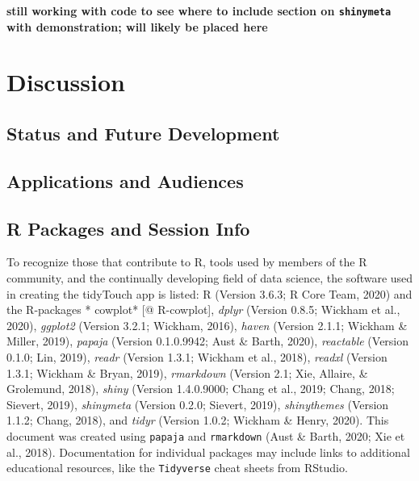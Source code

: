 \documentclass[english,man,floatsintext]{apa6}
\begin{document}
\textbf{still working with code to see where to include section on \texttt{shinymeta} with demonstration; will likely be placed here}

\hypertarget{discussion}{%
\section{Discussion}\label{discussion}}

\hypertarget{status-and-future-development}{%
\subsection{Status and Future Development}\label{status-and-future-development}}

\hypertarget{applications-and-audiences}{%
\subsection{Applications and Audiences}\label{applications-and-audiences}}

\hypertarget{r-packages-and-session-info}{%
\subsection{R Packages and Session Info}\label{r-packages-and-session-info}}

To recognize those that contribute to R, tools used by members of the R community, and the continually developing field of data science, the software used in creating the tidyTouch app is listed: R (Version 3.6.3; R Core Team, 2020) and the R-packages * cowplot* {[}@ R-cowplot{]}, \emph{dplyr} (Version 0.8.5; Wickham et al., 2020), \emph{ggplot2} (Version 3.2.1; Wickham, 2016), \emph{haven} (Version 2.1.1; Wickham \& Miller, 2019), \emph{papaja} (Version 0.1.0.9942; Aust \& Barth, 2020), \emph{reactable} (Version 0.1.0; Lin, 2019), \emph{readr} (Version 1.3.1; Wickham et al., 2018), \emph{readxl} (Version 1.3.1; Wickham \& Bryan, 2019), \emph{rmarkdown} (Version 2.1; Xie, Allaire, \& Grolemund, 2018), \emph{shiny} (Version 1.4.0.9000; Chang et al., 2019; Chang, 2018; Sievert, 2019), \emph{shinymeta} (Version 0.2.0; Sievert, 2019), \emph{shinythemes} (Version 1.1.2; Chang, 2018), and \emph{tidyr} (Version 1.0.2; Wickham \& Henry, 2020). This document was created using \texttt{papaja} and \texttt{rmarkdown} (Aust \& Barth, 2020; Xie et al., 2018). Documentation for individual packages may include links to additional educational resources, like the \texttt{Tidyverse} cheat sheets from RStudio.
\end{document}
